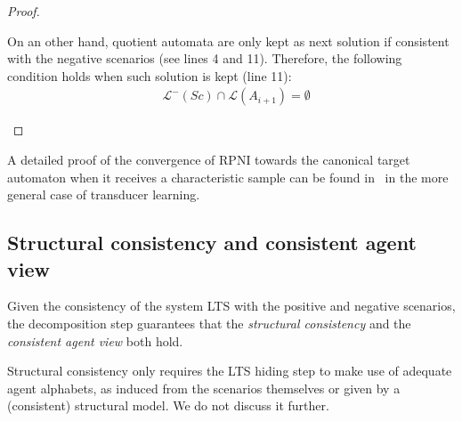 \begin{theorem}
\begin{proof}
\begin{description}
On an other hand, quotient automata are only kept as next solution if consistent with the negative scenarios (see lines 4 and 11). Therefore, the following condition holds when such solution is kept (line 11):
\begin{align*}
&\mathcal{L}^-(Sc) \cap \mathcal{L}(A_{i+1}) = \emptyset
\end{align*}

\end{description}
\end{proof}
\end{theorem}

A detailed proof of the convergence of RPNI towards the canonical target automaton when it receives a characteristic sample can be found in~\cite{Oncina:1993} in the more general case of transducer learning.


\subsection{Structural consistency and consistent agent view\label{subsection:consistent-agent-view}}

Given the consistency of the system LTS with the positive and negative scenarios, the decomposition step guarantees that the \emph{structural consistency} and the \emph{consistent agent view} both hold.

Structural consistency only requires the LTS hiding step to make use of adequate agent alphabets, as induced from the scenarios themselves or given by a (consistent) structural model. We do not discuss it further. 

